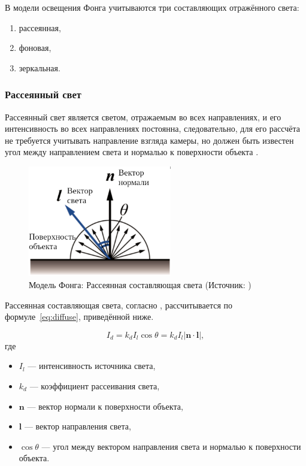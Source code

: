 В модели освещения Фонга \cite{realphong, phong, rogers} учитываются три составляющих отражённого света:
\begin{enumerate}
    \item рассеянная,
    \item фоновая,
    \item зеркальная.
\end{enumerate}

\subsubsection*{Рассеянный свет}

Рассеянный свет является светом, отражаемым во всех направлениях, и его интенсивность во всех направлениях постоянна, следовательно, для его рассчёта не требуется учитывать направление взгляда камеры, но должен быть известен угол между направлением света и нормалью к поверхности объекта \cite{phong}.

\begin{figure}[H]
	\centering
	\includegraphics[width=0.56\textwidth]{img/diffuse_ru}
    \caption{Модель Фонга: Рассеянная составляющая света (Источник: \cite{phong})}
	\label{fig:diffuse}
\end{figure}

Рассеянная составляющая света, согласно \cite{phong}, рассчитывается по формуле~\ref{eq:diffuse}, приведённой ниже.

\begin{equation}
    I_d = k_d I_l \cos \theta = k_d I_l \left| \boldsymbol{n} \cdot \boldsymbol{l} \right|,
    \label{eq:diffuse}
\end{equation}
где 
\begin{itemize}
    \item $I_l$ --- интенсивность источника света,
    \item $k_d$ --- коэффициент рассеивания света,
    \item $\boldsymbol{n}$ --- вектор нормали к поверхности объекта,
    \item $\boldsymbol{l}$ --- вектор направления света,
    \item $\cos \theta$ --- угол между вектором направления света и нормалью к поверхности объекта.
\end{itemize}

